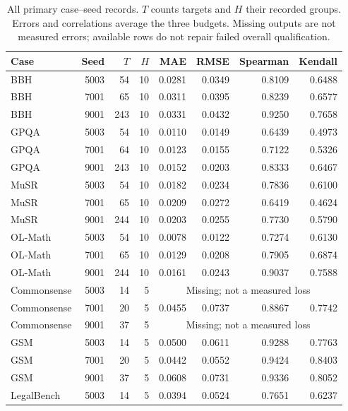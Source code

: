 \documentclass{article}
\begin{document}
\begin{table}[p]
\centering\small
\setlength{\tabcolsep}{3pt}
\caption{All primary case--seed records. $T$ counts targets and $H$ their recorded groups. Errors and correlations average the three budgets. Missing outputs are not measured errors; available rows do not repair failed overall qualification.}
\label{tab:seed_si}
\begin{tabular}{lrrrrrrr}
\toprule
Case & Seed & $T$ & $H$ & MAE & RMSE & Spearman & Kendall\\
\midrule
BBH & 5003 & 54 & 10 & 0.0281 & 0.0349 & 0.8109 & 0.6488 \\
BBH & 7001 & 65 & 10 & 0.0311 & 0.0395 & 0.8239 & 0.6577 \\
BBH & 9001 & 243 & 10 & 0.0331 & 0.0432 & 0.9250 & 0.7658 \\
GPQA & 5003 & 54 & 10 & 0.0110 & 0.0149 & 0.6439 & 0.4973 \\
GPQA & 7001 & 64 & 10 & 0.0123 & 0.0155 & 0.7122 & 0.5326 \\
GPQA & 9001 & 243 & 10 & 0.0152 & 0.0203 & 0.8333 & 0.6467 \\
MuSR & 5003 & 54 & 10 & 0.0182 & 0.0234 & 0.7836 & 0.6100 \\
MuSR & 7001 & 65 & 10 & 0.0209 & 0.0272 & 0.6419 & 0.4624 \\
MuSR & 9001 & 244 & 10 & 0.0203 & 0.0255 & 0.7730 & 0.5790 \\
OL-Math & 5003 & 54 & 10 & 0.0078 & 0.0122 & 0.7274 & 0.6130 \\
OL-Math & 7001 & 65 & 10 & 0.0129 & 0.0208 & 0.7905 & 0.6874 \\
OL-Math & 9001 & 244 & 10 & 0.0161 & 0.0243 & 0.9037 & 0.7588 \\
Commonsense & 5003 & 14 & 5 & \multicolumn{4}{c}{Missing; not a measured loss} \\
Commonsense & 7001 & 20 & 5 & 0.0455 & 0.0737 & 0.8867 & 0.7742 \\
Commonsense & 9001 & 37 & 5 & \multicolumn{4}{c}{Missing; not a measured loss} \\
GSM & 5003 & 14 & 5 & 0.0500 & 0.0611 & 0.9288 & 0.7763 \\
GSM & 7001 & 20 & 5 & 0.0442 & 0.0552 & 0.9424 & 0.8403 \\
GSM & 9001 & 37 & 5 & 0.0608 & 0.0731 & 0.9336 & 0.8052 \\
LegalBench & 5003 & 14 & 5 & 0.0394 & 0.0524 & 0.7651 & 0.6237 \\

\end{tabular}
\end{table}
\end{document}
